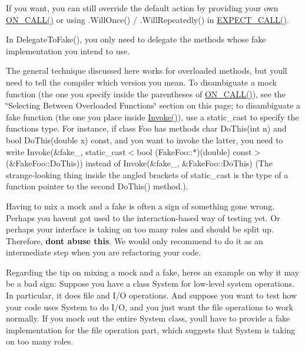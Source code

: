 \begin{DoxyItemize}
\item If you want, you can still override the default action by providing your own {\ttfamily \mbox{\hyperlink{gmock-spec-builders_8h_a5b12ae6cf84f0a544ca811b380c37334}{O\+N\+\_\+\+C\+A\+L\+L()}}} or using {\ttfamily .Will\+Once()} / {\ttfamily .Will\+Repeatedly()} in {\ttfamily \mbox{\hyperlink{gmock-spec-builders_8h_a535a6156de72c1a2e25a127e38ee5232}{E\+X\+P\+E\+C\+T\+\_\+\+C\+A\+L\+L()}}}.
\item In {\ttfamily Delegate\+To\+Fake()}, you only need to delegate the methods whose fake implementation you intend to use.
\item The general technique discussed here works for overloaded methods, but you\textquotesingle{}ll need to tell the compiler which version you mean. To disambiguate a mock function (the one you specify inside the parentheses of {\ttfamily \mbox{\hyperlink{gmock-spec-builders_8h_a5b12ae6cf84f0a544ca811b380c37334}{O\+N\+\_\+\+C\+A\+L\+L()}}}), see the \char`\"{}\+Selecting Between Overloaded Functions\char`\"{} section on this page; to disambiguate a fake function (the one you place inside {\ttfamily \mbox{\hyperlink{namespacetesting_a12aebaf8363d49a383047529f798b694}{Invoke()}}}), use a {\ttfamily static\+\_\+cast} to specify the function\textquotesingle{}s type. For instance, if class {\ttfamily Foo} has methods {\ttfamily char Do\+This(int n)} and {\ttfamily bool Do\+This(double x) const}, and you want to invoke the latter, you need to write {\ttfamily Invoke(\&fake\+\_\+, static\+\_\+cast$<$bool (Fake\+Foo\+:\+:$\ast$)(double) const$>$(\&Fake\+Foo\+::\+Do\+This))} instead of {\ttfamily Invoke(\&fake\+\_\+, \&\+Fake\+Foo\+::\+Do\+This)} (The strange-\/looking thing inside the angled brackets of {\ttfamily static\+\_\+cast} is the type of a function pointer to the second {\ttfamily Do\+This()} method.).
\item Having to mix a mock and a fake is often a sign of something gone wrong. Perhaps you haven\textquotesingle{}t got used to the interaction-\/based way of testing yet. Or perhaps your interface is taking on too many roles and should be split up. Therefore, {\bfseries{don\textquotesingle{}t abuse this}}. We would only recommend to do it as an intermediate step when you are refactoring your code.
\end{DoxyItemize}

Regarding the tip on mixing a mock and a fake, here\textquotesingle{}s an example on why it may be a bad sign\+: Suppose you have a class {\ttfamily System} for low-\/level system operations. In particular, it does file and I/O operations. And suppose you want to test how your code uses {\ttfamily System} to do I/O, and you just want the file operations to work normally. If you mock out the entire {\ttfamily System} class, you\textquotesingle{}ll have to provide a fake implementation for the file operation part, which suggests that {\ttfamily System} is taking on too many roles.

